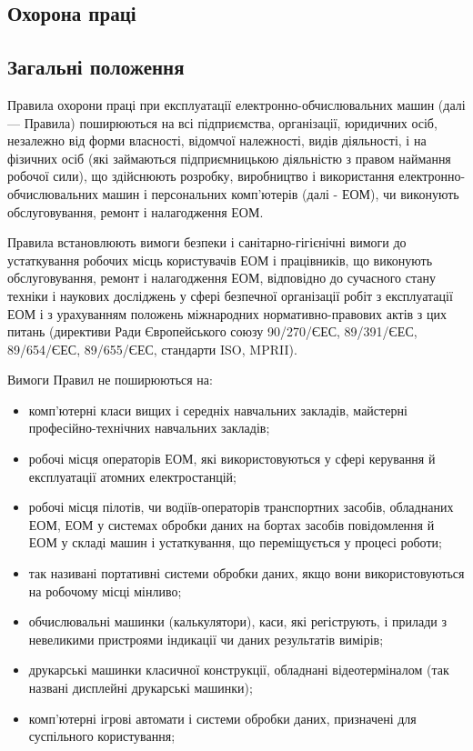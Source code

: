 \documentclass[simple,a4paper,14pt,ukrainian,utf8]{eskdtext}
\begin{document}
    \newpage
    \begin{appendices}

                \section{Охорона праці}

            \subsection{Загальні положення}

                Правила охорони праці при експлуатації електронно-обчислювальних машин (далі --- Правила) поширюються на всі підприємства, організації, юридичних осіб, незалежно від форми власності, відомчої належності, видів діяльності, і на фізичних осіб (які займаються підприємницькою діяльністю з правом наймання робочої сили), що здійснюють розробку, виробництво і використання електронно-обчислювальних машин і персональних комп'ютерів (далі - ЕОМ), чи виконують обслуговування, ремонт і налагодження ЕОМ.

                Правила встановлюють вимоги безпеки і санітарно-гігієнічні вимоги до устаткування робочих місць користувачів ЕОМ і працівників, що виконують обслуговування, ремонт і налагодження ЕОМ, відповідно до сучасного стану техніки і наукових досліджень у сфері безпечної організації робіт з експлуатації ЕОМ і з урахуванням положень міжнародних нормативно-правових актів з цих питань (директиви Ради Європейського союзу 90/270/ЄЕС, 89/391/ЄЕС, 89/654/ЄЕС, 89/655/ЄЕС, стандарти ISO, MPRII).

                Вимоги Правил не поширюються на:

                \begin{itemize}
                    \item комп'ютерні класи вищих і середніх навчальних закладів, майстерні професійно-технічних навчальних закладів;
                    \item робочі місця операторів ЕОМ, які використовуються у сфері керування й експлуатації атомних електростанцій;
                    \item робочі місця пілотів, чи водіїв-операторів транспортних засобів, обладнаних ЕОМ, ЕОМ у системах обробки даних на бортах засобів повідомлення й ЕОМ у складі машин і устаткування, що переміщується у процесі роботи;
                    \item так називані портативні системи обробки даних, якщо вони використовуються на робочому місці мінливо;
                    \item обчислювальні машинки (калькулятори), каси, які регіструють, і прилади з невеликими пристроями індикації чи даних результатів вимірів;
                    \item друкарські машинки класичної конструкції, обладнані відеотерміналом (так названі дисплейні друкарські машинки);
                    \item комп'ютерні ігрові автомати і системи обробки даних, призначені для суспільного користування;
                \end{itemize}


\end{appendices}
\end{document}
